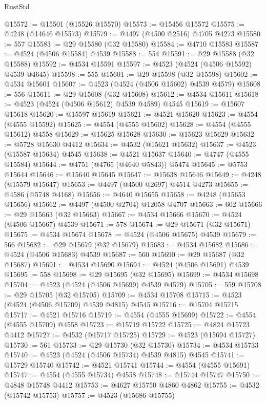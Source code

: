 \begin{lexlean}{RustStd}
\begin{coremodule}
@15572 := @15501 (@15526 @15570)
@15573 := @15456 @15572
@15575 := @4248 (@14646 @15573)
@15579 := @4497 (@4500 @2516) @4705 @4273
@15580 := 557
@15583 := @29 @15580 (@32 @15580)
@15584 := @4710 @15583
@15587 := @4524 (@4506 @15584) @4539
@15588 := 554
@15591 := @29 @15588 (@32 @15588)
@15592 := @4534 @15591
@15597 := @4523 (@4524 (@4506 @15592) @4539 @4645)
@15598 := 555
@15601 := @29 @15598 (@32 @15598)
@15602 := @4534 @15601
@15607 := @4523 (@4524 (@4506 @15602) @4539 @4579)
@15608 := 556
@15611 := @29 @15608 (@32 @15608)
@15612 := @4534 @15611
@15618 := @4523 (@4524 (@4506 @15612) @4539 @4589) @4545
@15619 := @15607 @15618
@15620 := @15597 @15619
@15621 := @4521 @15620
@15623 := @4554 (@4555 @15592)
@15625 := @4554 (@4555 @15602)
@15628 := @4554 (@4555 @15612) @4558
@15629 := @15625 @15628
@15630 := @15623 @15629
@15632 := @5728 @15630 @4412
@15634 := @4532 (@15621 @15632)
@15637 := @4523 (@15587 @15634) @4545
@15638 := @4521 @15637
@15640 := @4747 (@4555 @15584)
@15644 := @4751 (@4765 (@4640 @5843)) @5474
@15645 := @5753 @15644
@15646 := @15640 @15645
@15647 := @15638 @15646
@15649 := @4248 (@15579 @15647)
@15653 := @4497 (@4500 @2697) @4514 @4273
@15655 := @4586 (@5748 @4168)
@15656 := @4640 @15655
@15658 := @4248 (@15653 @15656)
@15662 := @4497 (@4500 @2704) @12058 @4707
@15663 := 602
@15666 := @29 @15663 (@32 @15663)
@15667 := @4534 @15666
@15670 := @4524 (@4506 @15667) @4539
@15671 := 578
@15674 := @29 @15671 (@32 @15671)
@15675 := @4534 @15674
@15678 := @4524 (@4506 @15675) @4539
@15679 := 566
@15682 := @29 @15679 (@32 @15679)
@15683 := @4534 @15682
@15686 := @4524 (@4506 @15683) @4539
@15687 := 560
@15690 := @29 @15687 (@32 @15687)
@15691 := @4534 @15690
@15694 := @4524 (@4506 @15691) @4539
@15695 := 558
@15698 := @29 @15695 (@32 @15695)
@15699 := @4534 @15698
@15704 := @4523 (@4524 (@4506 @15699) @4539 @4579)
@15705 := 559
@15708 := @29 @15705 (@32 @15705)
@15709 := @4534 @15708
@15715 := @4523 (@4524 (@4506 @15709) @4539 @4815) @4545
@15716 := @15704 @15715
@15717 := @4521 @15716
@15719 := @4554 (@4555 @15699)
@15722 := @4554 (@4555 @15709) @4558
@15723 := @15719 @15722
@15725 := @4824 @15723 @4412
@15727 := @4532 (@15717 @15725)
@15729 := @4523 (@15694 @15727)
@15730 := 561
@15733 := @29 @15730 (@32 @15730)
@15734 := @4534 @15733
@15740 := @4523 (@4524 (@4506 @15734) @4539 @4815) @4545
@15741 := @15729 @15740
@15742 := @4521 @15741
@15744 := @4554 (@4555 @15691)
@15747 := @4554 (@4555 @15734) @4558
@15748 := @15744 @15747
@15750 := @4848 @15748 @4412
@15753 := @4627 @15750 @4860 @4862
@15755 := @4532 (@15742 @15753)
@15757 := @4523 (@15686 @15755)

\end{coremodule}
\end{lexlean}
